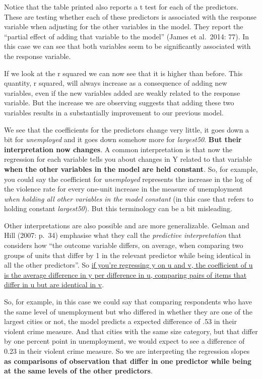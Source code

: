 \documentclass[
]{book}
\begin{document}
Notice that the table printed also reports a t test for each of the predictors. These are testing whether each of these predictors is associated with the response variable when adjusting for the other variables in the model. They report the ``partial effect of adding that variable to the model'' (James et al.~2014: 77). In this case we can see that both variables seem to be significantly associated with the response variable.

If we look at the r squared we can now see that it is higher than before. This quantity, r squared, will always increase as a consequence of adding new variables, even if the new variables added are weakly related to the response variable. But the increase we are observing suggests that adding these two variables results in a substantially improvement to our previous model.

We see that the coefficients for the predictors change very little, it goes down a bit for \emph{unemployed} and it goes down somehow more for \emph{largest50}. \textbf{But their interpretation now changes}. A common interpretation is that now the regression for each variable tells you about changes in Y related to that variable \textbf{when the other variables in the model are held constant}. So, for example, you could say the coefficient for \emph{unemployed} represents the increase in the log of the violence rate for every one-unit increase in the measure of unemployment \emph{when holding all other variables in the model constant} (in this case that refers to holding constant \emph{largest50}). But this terminology can be a bit misleading.

Other interpretations are also possible and are more generalizable. Gelman and Hill (2007: p.~34) emphasise what they call the \emph{predictive interpretation} that considers how ``the outcome variable differs, on average, when comparing two groups of units that differ by 1 in the relevant predictor while being identical in all the other predictors''. So \href{http://andrewgelman.com/2013/01/05/understanding-regression-models-and-regression-coefficients/}{if you're regressing y on u and v, the coefficient of u is the average difference in y per difference in u, comparing pairs of items that differ in u but are identical in v}.

So, for example, in this case we could say that comparing respondents who have the same level of unemployment but who differed in whether they are one of the largest cities or not, the model predicts a expected difference of .53 in their violent crime measure. And that cities with the same size category, but that differ by one percent point in unemployment, we would expect to see a difference of 0.23 in their violent crime measure. So we are interpreting the regression slopes \textbf{as comparisons of observation that differ in one predictor while being at the same levels of the other predictors}.
\end{document}
